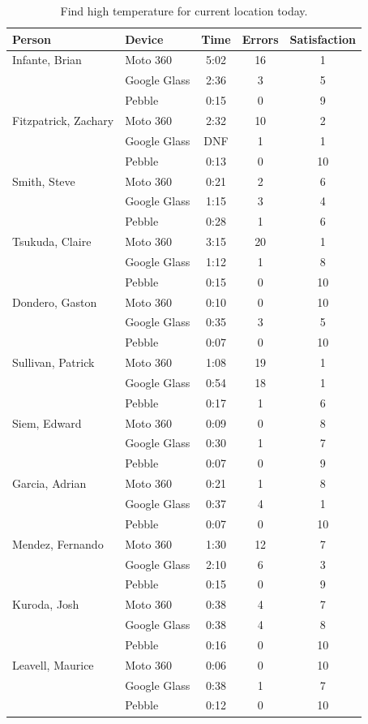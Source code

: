 \documentclass[11pt,a4paper]{scrartcl}
\begin{document}
\begin{appendices}
\begin{table}[h]
\caption{Find high temperature for current location today.} 
\centering
\begin{tabular}{@{}llccc@{}}
\toprule
Person & Device & Time & Errors & Satisfaction \\ \midrule
Infante, Brian & Moto 360 & 5:02 & 16 & 1 \\
 & Google Glass & 2:36 & 3 & 5 \\
 & Pebble & 0:15 & 0 & 9 \\
Fitzpatrick, Zachary & Moto 360 & 2:32 & 10 & 2 \\
 & Google Glass & DNF & 1 & 1 \\
 & Pebble & 0:13 & 0 & 10 \\
Smith, Steve & Moto 360 & 0:21 & 2 & 6 \\
 & Google Glass & 1:15 & 3 & 4 \\
 & Pebble & 0:28 & 1 & 6 \\
Tsukuda, Claire & Moto 360 & 3:15 & 20 & 1 \\
 & Google Glass & 1:12 & 1 & 8 \\
 & Pebble & 0:15 & 0 & 10 \\
Dondero, Gaston & Moto 360 & 0:10 & 0 & 10 \\
 & Google Glass & 0:35 & 3 & 5 \\
 & Pebble & 0:07 & 0 & 10 \\
Sullivan, Patrick & Moto 360 & 1:08 & 19 & 1 \\
 & Google Glass & 0:54 & 18 & 1 \\
 & Pebble & 0:17 & 1 & 6 \\
Siem, Edward & Moto 360 & 0:09 & 0 & 8 \\
 & Google Glass & 0:30 & 1 & 7 \\
 & Pebble & 0:07 & 0 & 9 \\
Garcia, Adrian & Moto 360 & 0:21 & 1 & 8 \\
 & Google Glass & 0:37 & 4 & 1 \\
 & Pebble & 0:07 & 0 & 10 \\
Mendez, Fernando & Moto 360 & 1:30 & 12 & 7 \\
 & Google Glass & 2:10 & 6 & 3 \\
 & Pebble & 0:15 & 0 & 9 \\
Kuroda, Josh & Moto 360 & 0:38 & 4 & 7 \\
 & Google Glass & 0:38 & 4 & 8 \\
 & Pebble & 0:16 & 0 & 10 \\
Leavell, Maurice & Moto 360 & 0:06 & 0 & 10 \\
 & Google Glass & 0:38 & 1 & 7 \\
 & Pebble & 0:12 & 0 & 10 \\ \bottomrule
\end{tabular}
\end{table}


\end{appendices}
\end{document}
